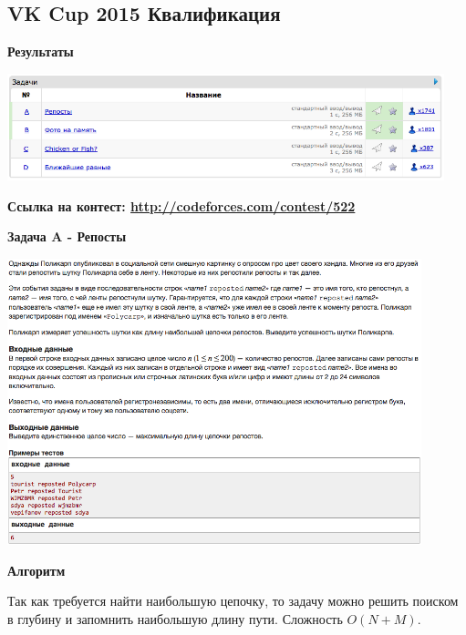 \documentclass[a4paper,12pt]{article}
\begin{document}
%
%

\newpage
\subsection{VK Cup 2015 Квалификация}

\textbf{{\large Результаты}} \\
\begin{center}
\includegraphics[width=0.95\textwidth]{VK_Qual/VK_Qual_result.png}\\ [1cm]
\end{center}

\textbf{{\large Ссылка на контест: \url{http://codeforces.com/contest/522}}}

\newpage
\textbf{{\large Задача A - Репосты}}

\begin{center}
\includegraphics[width=0.9\textwidth]{VK_Qual/VK_Qual_A.png}\\ [1cm]
\end{center}

\textbf{{\large Алгоритм}}

Так как требуется найти наибольшую цепочку, то задачу можно решить поиском в глубину и запомнить наибольшую длину пути. Сложность $O(N+M)$.\\
\end{document}
